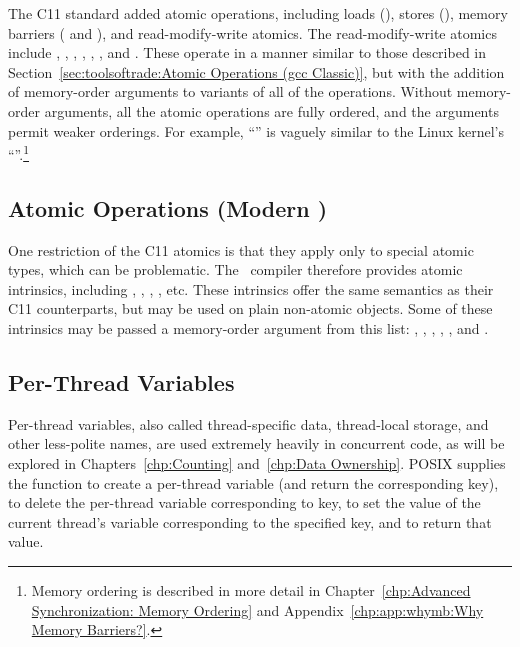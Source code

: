 The C11 standard added atomic operations,
including loads (),
stores (),
memory barriers ( and
), and read-modify-write atomics.
The read-modify-write atomics include
,
,
,
,
,
,
and
.
These operate in a manner similar to those described in
Section~\ref{sec:toolsoftrade:Atomic Operations (gcc Classic)},
but with the addition of memory-order arguments to 
variants of all of the operations.
Without memory-order arguments, all the atomic operations are
fully ordered, and the arguments permit weaker orderings.
For example, ``''
is vaguely similar to the Linux kernel's ``''.\footnote{
	Memory ordering is described in more detail in
	Chapter~\ref{chp:Advanced Synchronization: Memory Ordering} and
	Appendix~\ref{chp:app:whymb:Why Memory Barriers?}.}

\subsection{Atomic Operations (Modern \GCC)}
\label{sec:toolsoftrade:Atomic Operations (Modern gcc)}

One restriction of the C11 atomics is that they apply only to special
atomic types, which can be problematic.
The \GNUC\ compiler therefore provides atomic intrinsics, including
,
,
,
, etc.
These intrinsics offer the same semantics as their C11 counterparts,
but may be used on plain non-atomic objects.
Some of these intrinsics may be passed a memory-order argument from
this list:
,
,
,
,
, and
.

\subsection{Per-Thread Variables}
\label{sec:toolsoftrade:Per-Thread Variables}

Per-thread variables, also called thread-specific data, thread-local
storage, and other less-polite names, are used extremely
heavily in concurrent code, as will be explored in
Chapters~\ref{chp:Counting} and~\ref{chp:Data Ownership}.
POSIX supplies the  function to create a
per-thread variable (and return the corresponding key),
 to delete the per-thread variable corresponding
to key,
 to set the value of the current thread's
variable corresponding to the specified key,
and  to return that value.

